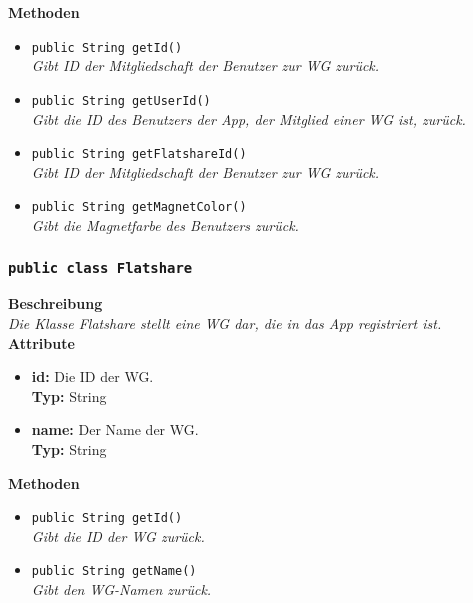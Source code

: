 	\textbf{Methoden}
	\begin{itemize}
		\item\texttt{{public String getId()}}\\
		\textit{Gibt ID der Mitgliedschaft der Benutzer zur WG zurück.}\\
		
		\item\texttt{{public String getUserId()}}\\
		\textit{Gibt die ID des Benutzers der App, der Mitglied einer WG ist, zurück.}\\
		
		\item\texttt{{public String getFlatshareId()}}\\
		\textit{Gibt ID der Mitgliedschaft der Benutzer zur WG zurück.}\\
		
		\item\texttt{{public String getMagnetColor()}}\\
		\textit{Gibt die Magnetfarbe des Benutzers zurück.}\\
	\end{itemize}       

\subsubsection{\texttt{public class Flatshare}}

	\textbf{Beschreibung} \\
	\textit{Die Klasse Flatshare stellt eine WG dar, die in das App registriert ist.} \\
	
	\textbf{Attribute}
	\begin{itemize}
		\item \textbf{id:} Die ID der WG. \\
		\textbf{Typ:} String
		\item \textbf{name:} Der Name der WG. \\
		\textbf{Typ:} String
	\end{itemize}

	\textbf{Methoden}
	\begin{itemize}
		\item\texttt{{public String getId()}}\\
		\textit{Gibt die ID der WG zurück.}\\
		\item\texttt{{public String getName()}}\\
		\textit{Gibt den WG-Namen zurück.}\\
	\end{itemize}

